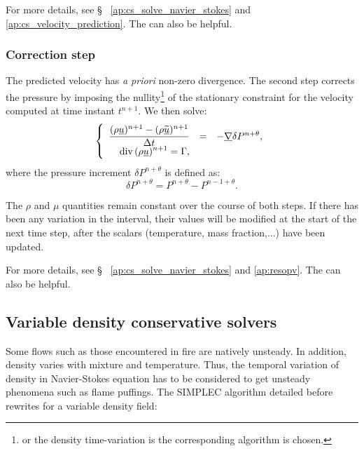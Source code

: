 For more details, see \S~ \ref{ap:cs_solve_navier_stokes} and \ref{ap:cs_velocity_prediction}. The  can also be helpful.

\subsubsection{Correction step}
The predicted velocity has \emph{a priori} non-zero divergence. The second step
corrects the pressure by imposing the nullity\footnote{or the density time-variation
is the corresponding algorithm is chosen.}
of the stationary constraint for
the velocity computed at time instant ${t^{n+1}}$.
We then solve:
\begin{equation}\label{eq:timstp:c0_correction_step}
\left\{\begin{array}{ r c l}
\displaystyle \dfrac{(\rho\underline{u})^{n+1}-(\rho\underline{\widetilde{u}})^{n+1}}{\Delta t} &=&
-\underline{\nabla}{\delta P^{n+\theta}} ,\\
\displaystyle
\text{div}\,(\rho\underline{u})^{n+1} = \Gamma ,\\
\end{array}\right.
\end{equation}
where the pressure increment $\delta P^{n+\theta}$ is defined as:
\begin{equation}
\delta P^{n+\theta}=P^{n+\theta}-P^{n-1+\theta} .
\end{equation}

\begin{remark}
The  $\rho$ and $\mu$ quantities remain constant over the course of both
steps. If there has been any variation in the interval, their values will be
modified at the start of the next time step, after the scalars
(temperature, mass fraction,...) have been updated.
\end{remark}


For more details, see \S~ \ref{ap:cs_solve_navier_stokes} and \ref{ap:resopv}. The  can also be helpful.

\subsection{Variable density conservative solvers}

Some flows such as those encountered in fire are natively unsteady.
In addition, density varies with mixture and temperature. Thus, the temporal
variation of density in Navier-Stokes equation has to be considered to get
unsteady phenomena such as flame puffings.
The SIMPLEC algorithm detailed before rewrites for a variable density field:

